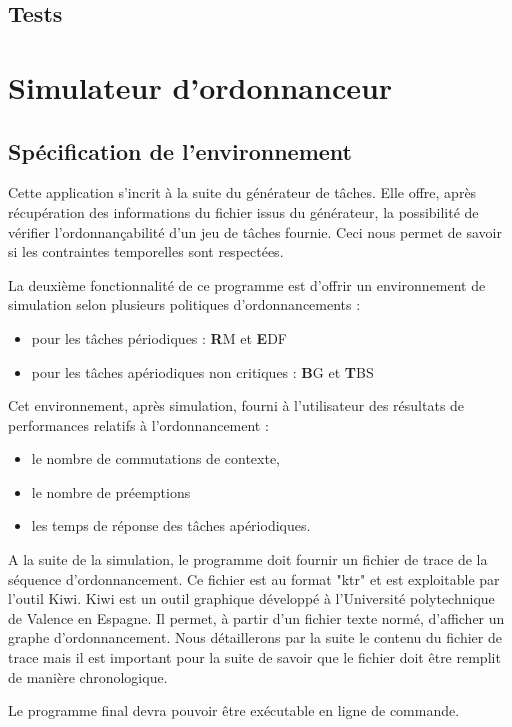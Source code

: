 \section{Tests}



\chapter{Simulateur d'ordonnanceur}
	\section{Spécification de l’environnement}
		Cette application s'incrit à la suite du générateur de tâches. Elle offre, après récupération des informations du fichier issus du générateur, la possibilité de vérifier l'ordonnançabilité d'un jeu de tâches fournie. Ceci nous permet de savoir si les contraintes temporelles sont respectées. 

	La deuxième fonctionnalité de ce programme est d'offrir un environnement de simulation selon plusieurs politiques d'ordonnancements :
	\begin{itemize}
		\item pour les tâches périodiques : \textbf RM et \textbf EDF
		\item pour les tâches apériodiques non critiques :  \textbf BG et \textbf TBS
	\end{itemize}
	Cet environnement, après simulation, fourni à l'utilisateur des résultats de performances relatifs à l'ordonnancement : 
	\begin{itemize}
		\item le nombre de commutations de contexte,
		\item le nombre de préemptions
		\item les temps de réponse des tâches apériodiques.
	\end{itemize}
	
	A la suite de la simulation, le programme doit fournir un fichier de trace de la séquence d'ordonnancement. Ce fichier est au format "ktr" et est exploitable par l'outil Kiwi. 
	Kiwi est un outil graphique développé à l'Université polytechnique de Valence en Espagne. Il permet, à partir d'un fichier texte normé, d'afficher un graphe d'ordonnancement. Nous détaillerons par la suite le contenu du fichier de trace mais il est important pour la suite de savoir que le fichier doit être remplit de manière chronologique.
		
	Le programme final devra pouvoir être exécutable en ligne de commande.\\
		
